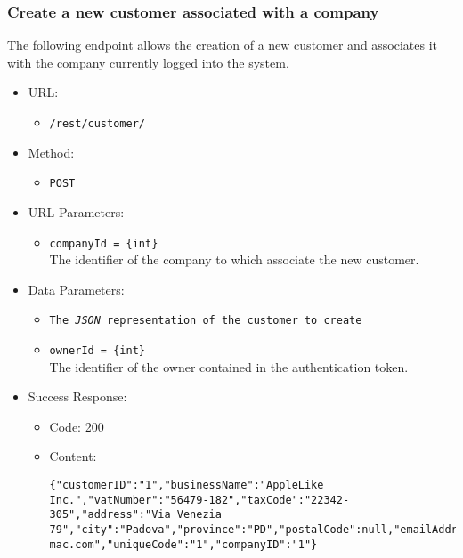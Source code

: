 \newpage
\subsubsection*{Create a new customer associated with a company}

The following endpoint allows the creation of a new customer and associates it with the company currently logged into the system.

\begin{itemize}
    
    \item URL: 
    \begin{itemize}
        \item \texttt{/rest/customer/}
    \end{itemize}
    
    \item Method: 
    \begin{itemize}
        \item \texttt{POST}
    \end{itemize}
    
    \item URL Parameters: 
    \begin{itemize}
        \item \texttt{companyId = \{int\}} \\
        The identifier of the company to which associate the new customer.
    \end{itemize}
    
    \item Data Parameters: 
    \begin{itemize}
        \item \texttt{The \textit{JSON} representation of the customer to create} 
        \item \texttt{ownerId = \{int\}} \\
        The identifier of the owner contained in the authentication token.
    \end{itemize}
    
    \item Success Response: 
    \begin{itemize}
        \item Code: 200
        \item Content:
        \begin{lstlisting}
{"customerID":"1","businessName":"AppleLike Inc.","vatNumber":"56479-182","taxCode":"22342-305","address":"Via Venezia 79","city":"Padova","province":"PD","postalCode":null,"emailAddress":"applelike@google.com","pec":"applelike@pec-mac.com","uniqueCode":"1","companyID":"1"}
        \end{lstlisting}    
    \end{itemize}
    

\end{itemize}
